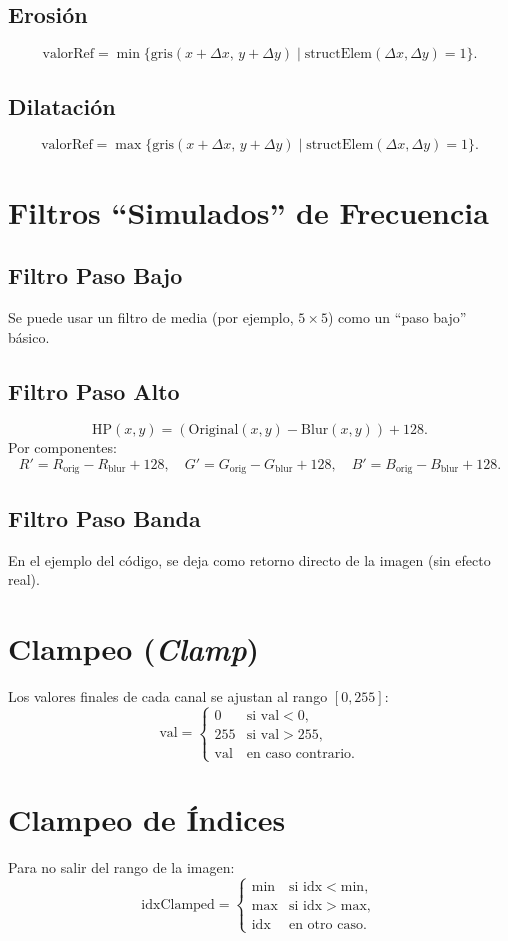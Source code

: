 \documentclass[11pt]{article}
\begin{document}
\subsection{Erosión}
\[
\text{valorRef} = \min \{ \text{gris}(x + \Delta x,\, y + \Delta y) \mid \text{structElem}(\Delta x,\Delta y) = 1\}.
\]

\subsection{Dilatación}
\[
\text{valorRef} = \max \{ \text{gris}(x + \Delta x,\, y + \Delta y) \mid \text{structElem}(\Delta x,\Delta y) = 1\}.
\]

\section{Filtros ``Simulados'' de Frecuencia}

\subsection{Filtro Paso Bajo}
Se puede usar un filtro de media (por ejemplo, \(5 \times 5\)) como un “paso bajo” básico.

\subsection{Filtro Paso Alto}
\[
\text{HP}(x,y) = (\text{Original}(x,y) - \text{Blur}(x,y)) + 128.
\]
Por componentes:
\[
R' = R_{\text{orig}} - R_{\text{blur}} + 128, \quad
G' = G_{\text{orig}} - G_{\text{blur}} + 128, \quad
B' = B_{\text{orig}} - B_{\text{blur}} + 128.
\]

\subsection{Filtro Paso Banda}
En el ejemplo del código, se deja como retorno directo de la imagen (sin efecto real).

\section{Clampeo (\textit{Clamp})}

Los valores finales de cada canal se ajustan al rango \([0, 255]\):
\[
\text{val} = 
\begin{cases}
0 & \text{si } \text{val} < 0,\\
255 & \text{si } \text{val} > 255,\\
\text{val} & \text{en caso contrario}.
\end{cases}
\]

\section{Clampeo de Índices}

Para no salir del rango de la imagen:
\[
\text{idxClamped} = 
\begin{cases}
\text{min} & \text{si } \text{idx} < \text{min},\\
\text{max} & \text{si } \text{idx} > \text{max},\\
\text{idx} & \text{en otro caso}.
\end{cases}
\]
\end{document}
